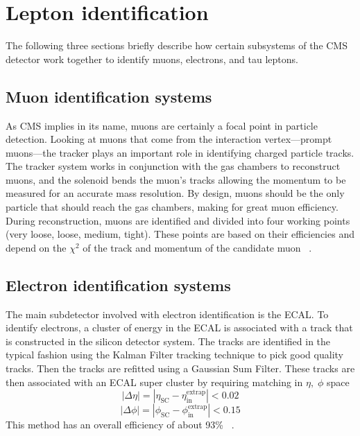 
\section{Lepton identification}
The following three sections briefly describe how certain subsystems of the CMS detector work together to identify muons, electrons, and tau leptons. 

\subsection{Muon identification systems}

As CMS implies in its name, muons are certainly a focal point in particle detection. 
Looking at muons that come from the interaction vertex---prompt muons---the tracker plays an important role in identifying charged particle tracks. 
The tracker system works in conjunction with the gas chambers to reconstruct muons, and the solenoid bends the muon's tracks allowing the momentum to be measured for an accurate mass resolution. By design, muons should be the only particle that should reach the gas chambers, making for great muon efficiency. 
During reconstruction, muons are identified and divided into four working points (very loose, loose, medium, tight). These points are based on their efficiencies and depend on the $\chi^2$ of the track and momentum of the candidate muon ~\cite{CMS-PAS-PFT-09-001,Kratschmer:1956760}.


\subsection{Electron identification systems}
The main subdetector involved with electron identification is the ECAL. To identify electrons, a cluster of energy in the ECAL is associated with a track that is constructed in the silicon detector system. 
The tracks are identified in the typical fashion using the Kalman Filter tracking technique to pick good quality tracks. Then the tracks are refitted using a Gaussian Sum Filter. 
These tracks are then associated with an ECAL super cluster by requiring matching in $\eta,\;\phi$ space
\begin{equation}|\Delta\eta| = |\eta_{\text{SC}} - \eta_{\text{in}}^{\text{extrap}}| < 0.02\end{equation}
\begin{equation}|\Delta\phi| = |\phi_{\text{SC}} - \phi_{\text{in}}^{\text{extrap}}| < 0.15\end{equation}
This method has an overall efficiency of about 93\% ~\cite{Khachatryan:2015hwa}. 

